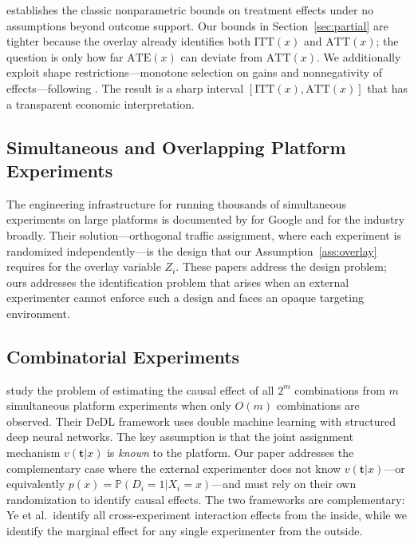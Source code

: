 \documentclass[12pt]{article}
\newcommand{\Prob}{\mathbb{P}}
\newcommand{\ATT}{\mathrm{ATT}}
\newcommand{\ATE}{\mathrm{ATE}}
\newcommand{\ITT}{\mathrm{ITT}}
\begin{document}
\citet{manski1990nonparametric} establishes the classic nonparametric bounds
on treatment effects under no assumptions beyond outcome support. Our bounds
in Section~\ref{sec:partial} are tighter because the overlay already identifies
both $\ITT(x)$ and $\ATT(x)$; the question is only how far $\ATE(x)$ can
deviate from $\ATT(x)$. We additionally exploit shape restrictions---monotone
selection on gains and nonnegativity of effects---following
\citet{manski2000monotone}. The result is a sharp interval $[\ITT(x), \ATT(x)]$
that has a transparent economic interpretation.

\subsection*{Simultaneous and Overlapping Platform Experiments}

The engineering infrastructure for running thousands of simultaneous experiments
on large platforms is documented by \citet{tang2010overlapping} for Google and
\citet{kohavi2020trustworthy} for the industry broadly. Their solution---orthogonal
traffic assignment, where each experiment is randomized independently---is the
design that our Assumption~\ref{ass:overlay} requires for the overlay variable
$Z_i$. These papers address the design problem; ours addresses the identification
problem that arises when an external experimenter cannot enforce such a design
and faces an opaque targeting environment.

\subsection*{Combinatorial Experiments}

\citet{ye2025deep} study the problem of estimating the causal effect of all
$2^m$ combinations from $m$ simultaneous platform experiments when only $O(m)$
combinations are observed. Their DeDL framework uses double machine learning
\citep{chernozhukov2018double} with structured deep neural networks. The key
assumption is that the joint assignment mechanism $v(\mathbf{t}|x)$ is
\emph{known} to the platform. Our paper addresses the complementary case where
the external experimenter does not know $v(\mathbf{t}|x)$---or equivalently
$p(x) = \Prob(D_i=1|X_i=x)$---and must rely on their own randomization to
identify causal effects. The two frameworks are complementary: Ye et al.\
identify all cross-experiment interaction effects from the inside, while we
identify the marginal effect for any single experimenter from the outside.
\end{document}

